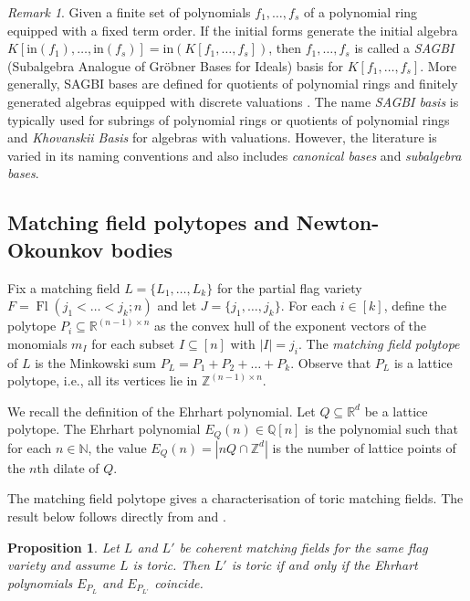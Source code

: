 \documentclass[11pt]{article}
\newcommand{\NN}{\mathbb N}
\newcommand{\QQ}{\mathbb Q}
\newcommand{\RR}{\mathbb R}
\newcommand{\ZZ}{\mathbb Z}
\newcommand{\init}{\text{in}}
\DeclareMathOperator{\Fl}{Fl}
\theoremstyle{plain}
\newtheorem{proposition}[theorem]{Proposition}
\theoremstyle{definition}
\theoremstyle{remark}
\newtheorem{remark}[theorem]{Remark}
\begin{document}
\begin{remark}\label{rmk: sagbi}
    Given a finite set of polynomials $f_1, \dots, f_s$ of a polynomial ring equipped with a fixed term order. If the initial forms generate the initial algebra $K[\init(f_1), \dots, \init(f_s)] = \init(K[f_1, \dots, f_s])$, then $f_1, \dots, f_s$ is called a \textit{SAGBI} (Subalgebra Analogue of Gr\"obner Bases for Ideals) basis for $K[f_1, \dots, f_s]$. More generally, SAGBI bases are defined for quotients of polynomial rings \cite{stillman1999using} and finitely generated algebras equipped with discrete valuations \cite{kaveh2019khovanskii}. The name \textit{SAGBI basis} is typically used for subrings of polynomial rings or quotients of polynomial rings and \textit{Khovanskii Basis} for algebras with valuations. However, the literature is varied in its naming conventions and also includes \textit{canonical bases} and \textit{subalgebra bases}.
\end{remark}


\subsection{Matching field polytopes and Newton-Okounkov bodies}\label{sec: bg polytopes}

Fix a matching field $L = \{L_1, \dots, L_k\}$ for the partial flag variety $F = \Fl(j_1 < \dots < j_k; n)$ and let $J = \{j_1, \dots, j_k\}$. For each $i \in [k]$, define the polytope $P_i \subseteq \RR^{(n-1) \times n}$ as the convex hull of the exponent vectors of the monomials $m_I$ for each subset $I \subseteq [n]$ with $|I| = j_i$. The \textit{matching field polytope} of $L$ is the Minkowski sum $P_L = P_1 + P_2 + \dots + P_k$. Observe that $P_L$ is a lattice polytope, i.e., all its vertices lie in $\ZZ^{(n-1) \times n}$.

We recall the definition of the Ehrhart polynomial. Let $Q \subseteq \RR^d$ be a lattice polytope. The Ehrhart polynomial $E_Q(n) \in \QQ[n]$ is the polynomial such that for each $n \in \NN$, the value $E_Q(n) = |nQ \cap \ZZ^d|$ is the number of lattice points of the $n$th dilate of $Q$.

The matching field polytope gives a characterisation of toric matching fields. The result below follows directly from \cite[Theorem~1]{clarke2022partial} and \cite[Theorem~1]{clarke2022combinatorial}.

\begin{proposition}\label{prop: bg toric degen via polytope}
    Let $L$ and $L'$ be coherent matching fields for the same flag variety and assume $L$ is toric. Then $L'$ is toric if and only if the Ehrhart polynomials $E_{P_{L}}$ and $E_{P_{L'}}$ coincide.
\end{proposition}
\end{document}
